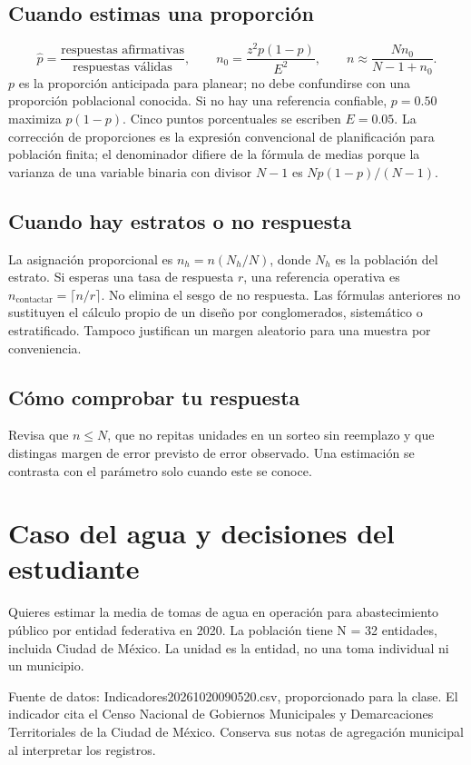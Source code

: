 \documentclass[11pt,letterpaper]{article}
\begin{document}
\subsection{Cuando estimas una proporción}
\[\widehat p=\frac{\text{respuestas afirmativas}}{\text{respuestas válidas}},\qquad
n_0=\frac{z^2p(1-p)}{E^2},\qquad n\approx\frac{Nn_0}{N-1+n_0}.\]
$p$ es la proporción anticipada para planear; no debe confundirse con una proporción poblacional conocida. Si no hay una referencia confiable, $p=0.50$ maximiza $p(1-p)$. Cinco puntos porcentuales se escriben $E=0.05$.
La corrección de proporciones es la expresión convencional de planificación para población finita; el denominador difiere de la fórmula de medias porque la varianza de una variable binaria con divisor $N-1$ es $Np(1-p)/(N-1)$.
\subsection{Cuando hay estratos o no respuesta}
La asignación proporcional es $n_h=n(N_h/N)$, donde $N_h$ es la población del estrato. Si esperas una tasa de respuesta $r$, una referencia operativa es $n_{\mathrm{contactar}}=\lceil n/r\rceil$. No elimina el sesgo de no respuesta.
Las fórmulas anteriores no sustituyen el cálculo propio de un diseño por conglomerados, sistemático o estratificado. Tampoco justifican un margen aleatorio para una muestra por conveniencia.
\subsection{Cómo comprobar tu respuesta}
Revisa que $n\leq N$, que no repitas unidades en un sorteo sin reemplazo y que distingas margen de error previsto de error observado. Una estimación se contrasta con el parámetro solo cuando este se conoce.
\clearpage

\section{Caso del agua y decisiones del estudiante}
Quieres estimar la media de tomas de agua en operación para abastecimiento público por entidad federativa en 2020. La población tiene N = 32 entidades, incluida Ciudad de México. La unidad es la entidad, no una toma individual ni un municipio.

Fuente de datos: Indicadores20261020090520.csv, proporcionado para la clase. El indicador cita el Censo Nacional de Gobiernos Municipales y Demarcaciones Territoriales de la Ciudad de México. Conserva sus notas de agregación municipal al interpretar los registros.
\end{document}
